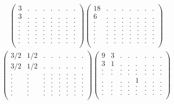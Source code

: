 \documentclass[12pt,a4paper]{amsart}
\begin{document}
\begin{align*}
\left(\begin{array}{rrrrrrrr}%
3&.&.&.&.&.&.&.\\%
3&.&.&.&.&.&.&.\\%
.&.&.&.&.&.&.&.\\%
.&.&.&.&.&.&.&.\\%
.&.&.&.&.&.&.&.\\%
.&.&.&.&.&.&.&.\\%
.&.&.&.&.&.&.&.\\%
.&.&.&.&.&.&.&.\\%
\end{array}\right)%
\left(\begin{array}{rrrrrrrr}%
18&.&.&.&.&.&.&.\\%
6&.&.&.&.&.&.&.\\%
.&.&.&.&.&.&.&.\\%
.&.&.&.&.&.&.&.\\%
.&.&.&.&.&.&.&.\\%
.&.&.&.&.&.&.&.\\%
.&.&.&.&.&.&.&.\\%
.&.&.&.&.&.&.&.\\%
\end{array}\right)%
\end{align*}
\begin{align*}
\left(\begin{array}{rrrrrrrr}%
3/2&1/2&.&.&.&.&.&.\\%
3/2&1/2&.&.&.&.&.&.\\%
.&.&.&.&.&.&.&.\\%
.&.&.&.&.&.&.&.\\%
.&.&.&.&.&.&.&.\\%
.&.&.&.&.&.&.&.\\%
.&.&.&.&.&.&.&.\\%
.&.&.&.&.&.&.&.\\%
\end{array}\right)%
\left(\begin{array}{rrrrrrrr}%
9&3&.&.&.&.&.&.\\%
3&1&.&.&.&.&.&.\\%
.&.&.&.&.&.&.&.\\%
.&.&.&.&.&.&.&.\\%
.&.&.&.&1&.&.&.\\%
.&.&.&.&.&.&.&.\\%
.&.&.&.&.&.&.&.\\%
.&.&.&.&.&.&.&.\\%
\end{array}\right)%
\end{align*}
\end{document}
